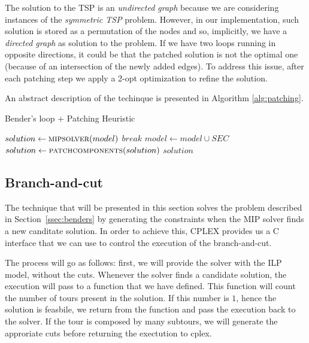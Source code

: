 \documentclass{article}
\begin{document}
The solution to the TSP is an \textit{undirected graph} because
we are considering instances of the \textit{symmetric TSP} problem.
However, in our implementation, such solution is stored as a permutation of the nodes and
so, implicitly, we have a \textit{directed graph} as solution to the problem.
If we have two loops running in opposite directions, it could be that the
patched solution is not the optimal one (because of an intersection of the newly added edges).
To address this issue, after each patching step we apply a 2-opt optimization to refine the solution.

An abstract description of the techinque is presented in Algorithm \ref{alg:patching}.

\begin{algorithm}[ht]
\caption{Bender's loop + Patching Heuristic}
\label{alg:patching}
\begin{algorithmic}
                \State $solution \gets \Call{mipsolver}{model}$
                        \State $break$
                \EndIf
                \State $model \gets model \cup SEC$
                \State $solution \gets \Call{patchcomponents}{solution}$
        \EndWhile
        \State \Return $solution$
\EndProcedure
\end{algorithmic}
\end{algorithm}

\subsection{Branch-and-cut}
The technique that will be presented in this section solves the problem
described in Section~\ref{ssec:benders} by generating the constraints when
the MIP solver finds a new canditate solution. In order to achieve this,
CPLEX provides us a C interface that we can use to control the execution
of the branch-and-cut.

The process will go as follows: first, we will provide the solver with the
ILP model, without the cuts. Whenever the solver finds a candidate solution,
the execution will pass to a function that we have defined. This function
will count the number of tours present in the solution. If this number is $1$,
hence the solution is feasbile, we return from the function and pass the
execution back to the solver. If the tour is composed by many subtours,
we will generate the approriate cuts before returning the exectution to
cplex.
\end{document}
